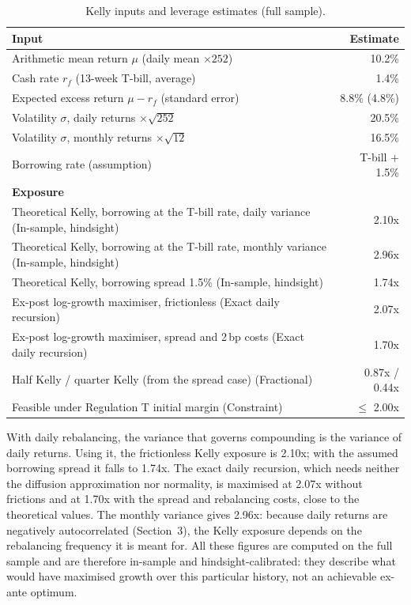 \documentclass[11pt,a4paper]{article}
\begin{document}
\begin{table}[H]
\small
\caption{Kelly inputs and leverage estimates (full sample).}
\label{tab:kelly}
\begin{tabularx}{\linewidth}{L r}
\toprule
\textbf{Input} & \textbf{Estimate} \\
\midrule
Arithmetic mean return $\mu$ (daily mean $\times 252$) & 10.2\% \\
Cash rate $r_f$ (13-week T-bill, average) & 1.4\% \\
Expected excess return $\mu - r_f$ (standard error) & 8.8\% (4.8\%) \\
Volatility $\sigma$, daily returns $\times\sqrt{252}$ & 20.5\% \\
Volatility $\sigma$, monthly returns $\times\sqrt{12}$ & 16.5\% \\
Borrowing rate (assumption) & T-bill $+$ 1.5\% \\
\midrule
\textbf{Exposure} & \\
Theoretical Kelly, borrowing at the T-bill rate, daily variance (In-sample, hindsight) & 2.10x \\
Theoretical Kelly, borrowing at the T-bill rate, monthly variance (In-sample, hindsight) & 2.96x \\
Theoretical Kelly, borrowing spread 1.5\% (In-sample, hindsight) & 1.74x \\
Ex-post log-growth maximiser, frictionless (Exact daily recursion) & 2.07x \\
Ex-post log-growth maximiser, spread and 2\,bp costs (Exact daily recursion) & 1.70x \\
Half Kelly / quarter Kelly (from the spread case) (Fractional) & 0.87x / 0.44x \\
Feasible under Regulation T initial margin (Constraint) & $\le$ 2.00x \\
\bottomrule
\end{tabularx}
\end{table}
With daily rebalancing, the variance that governs compounding is the variance of daily returns. Using it, the frictionless Kelly exposure is 2.10x; with the assumed borrowing spread it falls to 1.74x. The exact daily recursion, which needs neither the diffusion approximation nor normality, is maximised at 2.07x without frictions and at 1.70x with the spread and rebalancing costs, close to the theoretical values. The monthly variance gives 2.96x: because daily returns are negatively autocorrelated (Section~3), the Kelly exposure depends on the rebalancing frequency it is meant for. All these figures are computed on the full sample and are therefore in-sample and hindsight-calibrated: they describe what would have maximised growth over this particular history, not an achievable ex-ante optimum.
\end{document}
